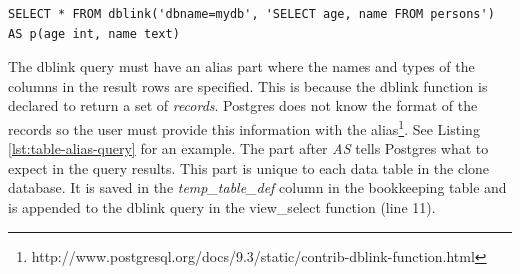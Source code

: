 \begin{lstlisting}[caption={An example of a SELECT query with a table alias},label={lst:table-alias-query}]
SELECT * FROM dblink('dbname=mydb', 'SELECT age, name FROM persons') AS p(age int, name text)
\end{lstlisting}

The dblink query must have an alias part where the names and types of the columns in the result rows are specified.
This is because the dblink function is declared to return a set of \textit{records}.
Postgres does not know the format of the records so the user must provide this information with the alias\footnote{http://www.postgresql.org/docs/9.3/static/contrib-dblink-function.html}.
See Listing \ref{lst:table-alias-query} for an example.
The part after \textit{AS} tells Postgres what to expect in the query results.
This part is unique to each data table in the clone database.
It is saved in the \textit{temp\_table\_def} column in the bookkeeping table and is appended to the dblink query in the view\_select function (line 11).
